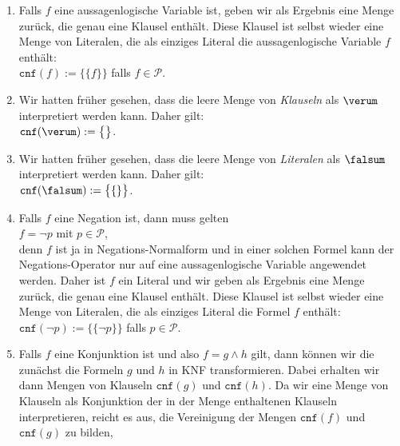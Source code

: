 \begin{enumerate}
\item Falls $f$ eine aussagenlogische Variable ist, geben wir als Ergebnis eine Menge zurück, die genau eine
      Klausel enthält.  Diese Klausel ist selbst wieder eine Menge von Literalen, die als einziges Literal die
      aussagenlogische Variable $f$ enthält:
      \\[0.2cm]
      \hspace*{1.3cm}
      $\texttt{cnf}(f) := \bigl\{\{f\}\bigr\}$ \quad falls $f \in \mathcal{P}$.
\item Wir hatten früher gesehen, dass die leere Menge von \emph{Klauseln} als $\verum$ interpretiert werden kann.
      Daher gilt:
      \\[0.2cm]
      \hspace*{1.3cm}
      $\texttt{cnf}(\verum) := \bigl\{\bigr\}$.      
\item Wir hatten früher gesehen, dass die leere Menge von \emph{Literalen} als $\falsum$ interpretiert werden kann.
      Daher gilt:
      \\[0.2cm]
      \hspace*{1.3cm}
      $\texttt{cnf}(\falsum) := \bigl\{\{\}\bigr\}$.      
\item Falls $f$ eine Negation ist, dann muss gelten
      \\[0.2cm]
      \hspace*{1.3cm}
      $f = \neg p$ \quad mit $p \in \mathcal{P}$,
      \\[0.2cm]
      denn $f$ ist ja in Negations-Normalform und in einer solchen Formel kann der Negations-Operator nur auf
      eine aussagenlogische Variable angewendet werden.  Daher ist $f$ ein Literal und wir geben als Ergebnis
      eine Menge zurück, die genau eine Klausel enthält.  Diese Klausel ist selbst wieder eine Menge von
      Literalen, die als einziges Literal die Formel $f$ enthält:
      \\[0.2cm]
      \hspace*{1.3cm}
      $\texttt{cnf}(\neg p) := \bigl\{\{\neg p\}\bigr\}$ \quad falls $p \in \mathcal{P}$.
\item Falls $f$ eine Konjunktion ist und also $f = g \wedge h$ gilt,  dann können wir die 
      zunächst die Formeln $g$ und $h$ in KNF transformieren.  Dabei erhalten wir dann Mengen von Klauseln 
      $\texttt{cnf}(g)$ und $\texttt{cnf}(h)$.  Da wir eine Menge von Klauseln als Konjunktion der in der Menge
      enthaltenen Klauseln interpretieren, reicht es aus,  
      die Vereinigung der Mengen $\texttt{cnf}(f)$ und $\texttt{cnf}(g)$ zu bilden,

\end{enumerate}
